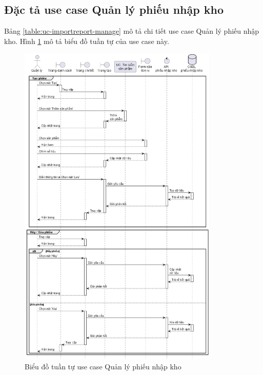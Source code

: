 \documentclass[../DoAn.tex]{subfiles}
\begin{document}
\subsection{Đặc tả use case Quản lý phiếu nhập kho}
\label{section:uc-importreport-manage}
Bảng \ref{table:uc-importreport-manage} mô tả chi tiết use case Quản lý phiếu nhập kho. Hình \ref{figure:sd-importreport-manage} mô tả biểu đồ tuần tự của use case này.
\begin{figure}[H]
    \centering
    \includegraphics[width=0.85\textwidth]{Hinhve/sequences/ImportReportManage.png}
    \caption{Biểu đồ tuần tự use case Quản lý phiếu nhập kho}
    \label{figure:sd-importreport-manage}
\end{figure}
\break
\end{document}
